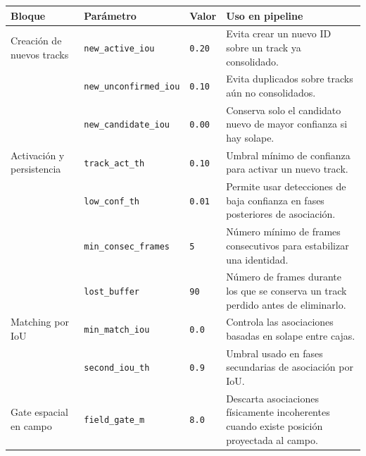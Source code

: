 \begin{table}[htbp]
\centering
\scriptsize
\setlength{\tabcolsep}{3pt}
\renewcommand{\arraystretch}{1.12}
\begin{tabularx}{\textwidth}{
>{\raggedright\arraybackslash}p{2.7cm}
>{\raggedright\arraybackslash}p{3.1cm}
>{\raggedright\arraybackslash}p{1.5cm}
>{\raggedright\arraybackslash}X
}
\toprule
\textbf{Bloque} & \textbf{Parámetro} & \textbf{Valor} & \textbf{Uso en pipeline} \\
\midrule

Creación de nuevos tracks &
\texttt{new\_active\_iou} &
\texttt{0.20} &
Evita crear un nuevo ID sobre un track ya consolidado. \\

&
\texttt{new\_unconfirmed\_iou} &
\texttt{0.10} &
Evita duplicados sobre tracks aún no consolidados. \\

&
\texttt{new\_candidate\_iou} &
\texttt{0.00} &
Conserva solo el candidato nuevo de mayor confianza si hay solape. \\

\midrule

Activación y persistencia &
\texttt{track\_act\_th} &
\texttt{0.10} &
Umbral mínimo de confianza para activar un nuevo track. \\

&
\texttt{low\_conf\_th} &
\texttt{0.01} &
Permite usar detecciones de baja confianza en fases posteriores de asociación. \\

&
\texttt{min\_consec\_frames} &
\texttt{5} &
Número mínimo de frames consecutivos para estabilizar una identidad. \\

&
\texttt{lost\_buffer} &
\texttt{90} &
Número de frames durante los que se conserva un track perdido antes de eliminarlo. \\

\midrule

Matching por IoU &
\texttt{min\_match\_iou} &
\texttt{0.0} &
Controla las asociaciones basadas en solape entre cajas. \\

&
\texttt{second\_iou\_th} &
\texttt{0.9} &
Umbral usado en fases secundarias de asociación por IoU. \\

\midrule

Gate espacial en campo &
\texttt{field\_gate\_m} &
\texttt{8.0} &
Descarta asociaciones físicamente incoherentes cuando existe posición proyectada al campo. \\


\end{tabularx}
\end{table}
